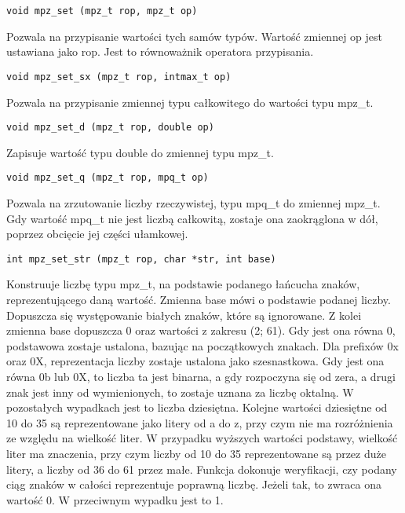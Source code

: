 \documentclass[twoside,a4paper]{book}
\begin{document}
\begin{lstlisting}
void mpz_set (mpz_t rop, mpz_t op)
\end{lstlisting}

Pozwala na przypisanie wartości tych samów typów. Wartość zmiennej op jest ustawiana jako rop. Jest to równoważnik operatora przypisania.

\begin{lstlisting}
void mpz_set_sx (mpz_t rop, intmax_t op)
\end{lstlisting}

Pozwala na przypisanie zmiennej typu całkowitego do wartości typu mpz\_t.

\begin{lstlisting}
void mpz_set_d (mpz_t rop, double op)
\end{lstlisting}

Zapisuje wartość typu double do zmiennej typu mpz\_t.

\begin{lstlisting}
void mpz_set_q (mpz_t rop, mpq_t op)
\end{lstlisting}

Pozwala na zrzutowanie liczby rzeczywistej, typu mpq\_t do zmiennej mpz\_t. Gdy wartość mpq\_t nie jest liczbą całkowitą, zostaje ona zaokrąglona w dół, poprzez obcięcie jej części ułamkowej.

\begin{lstlisting}
int mpz_set_str (mpz_t rop, char *str, int base)
\end{lstlisting}

Konstruuje liczbę typu mpz\_t, na podstawie podanego łańcucha znaków, reprezentującego daną wartość. Zmienna base mówi o podstawie podanej liczby. Dopuszcza się występowanie białych znaków, które są ignorowane. Z kolei zmienna base dopuszcza 0 oraz wartości z zakresu (2; 61). Gdy jest ona równa 0, podstawowa zostaje ustalona, bazując na początkowych znakach. Dla prefixów 0x oraz 0X, reprezentacja liczby zostaje ustalona jako szesnastkowa. Gdy jest ona równa 0b lub 0X, to liczba ta jest binarna, a gdy rozpoczyna się od zera, a drugi znak jest inny od wymienionych, to zostaje uznana za liczbę oktalną. W pozostałych wypadkach jest to liczba dziesiętna. Kolejne wartości dziesiętne od 10 do 35 są reprezentowane jako litery od a do z, przy czym nie ma rozróżnienia ze względu na wielkość liter. W przypadku wyższych wartości podstawy, wielkość liter ma znaczenia, przy czym liczby od 10 do 35 reprezentowane są przez duże litery, a liczby od 36 do 61 przez małe. Funkcja dokonuje weryfikacji, czy podany ciąg znaków w całości reprezentuje poprawną liczbę. Jeżeli tak, to zwraca ona wartość 0. W przeciwnym wypadku jest to 1.
\end{document}

